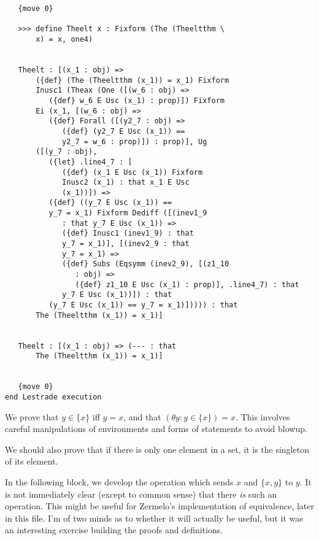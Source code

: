 \documentclass[12pt]{article}
\begin{document}
\begin{verbatim}
   {move 0}

   >>> define Theelt x : Fixform (The (Theeltthm \
       x) = x, one4)


   Theelt : [(x_1 : obj) => 
       ({def} (The (Theeltthm (x_1)) = x_1) Fixform 
       Inusc1 (Theax (One ([(w_6 : obj) => 
          ({def} w_6 E Usc (x_1) : prop)]) Fixform 
       Ei (x_1, [(w_6 : obj) => 
          ({def} Forall ([(y2_7 : obj) => 
             ({def} (y2_7 E Usc (x_1)) == 
             y2_7 = w_6 : prop)]) : prop)], Ug 
       ([(y_7 : obj), 
          ({let} .line4_7 : [
             ({def} (x_1 E Usc (x_1)) Fixform 
             Inusc2 (x_1) : that x_1 E Usc 
             (x_1))]) => 
          ({def} ((y_7 E Usc (x_1)) == 
          y_7 = x_1) Fixform Dediff ([(inev1_9 
             : that y_7 E Usc (x_1)) => 
             ({def} Inusc1 (inev1_9) : that 
             y_7 = x_1)], [(inev2_9 : that 
             y_7 = x_1) => 
             ({def} Subs (Eqsymm (inev2_9), [(z1_10 
                : obj) => 
                ({def} z1_10 E Usc (x_1) : prop)], .line4_7) : that 
             y_7 E Usc (x_1))]) : that 
          (y_7 E Usc (x_1)) == y_7 = x_1)])))) : that 
       The (Theeltthm (x_1)) = x_1)]


   Theelt : [(x_1 : obj) => (--- : that 
       The (Theeltthm (x_1)) = x_1)]


   {move 0}
end Lestrade execution
\end{verbatim}

We prove that $y \in \{x\}$ iff $y=x$, and that $(\theta y: y \in \{x\})=x$.  This involves careful manipulations of environments and forms of statements to avoid blowup.

We should also prove that if there is only one element in a set, it is the singleton of its element.

In the following block, we develop the operation which sends $x$ and $\{x,y\}$ to $y$.  It is not immediately clear (except to common sense) that there
{\em is\/} such an operation.  This might be useful for Zermelo's implementation of equivalence, later in this file.  I'm of two minds as to whether it will actually be useful, but it was an interesting exercise building the proofs and definitions.
\end{document}
